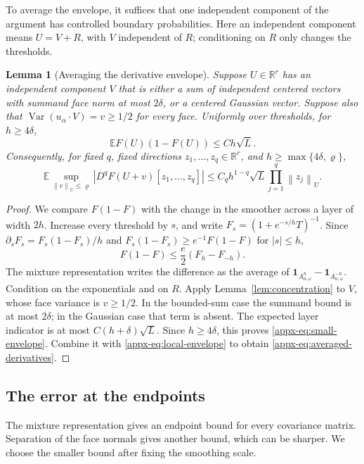 \documentclass[11pt,letterpaper]{article}
\newtheorem{lemma}{Lemma}
\theoremstyle{remark}
\newcommand{\E}{\mathbb E}
\newcommand{\R}{\mathbb R}
\newcommand{\Var}{\operatorname{Var}}
\newcommand{\norm}[1]{\left\lVert#1\right\rVert}
\newcommand{\ind}{\mathbf 1}
\begin{document}
To average the envelope, it suffices that one independent component
of the argument has controlled boundary probabilities. Here an
independent component means \(U=V+R\), with \(V\) independent of \(R\);
conditioning on \(R\) only changes the thresholds.
\begin{lemma}[Averaging the derivative envelope]\label{appx-lem:envelope}
Suppose \(U\in\R^r\) has an independent component \(V\) that is
either a sum of independent centered vectors with summand face norm
at most \(2\delta\), or a centered Gaussian vector. Suppose also
that \(\Var(u_\alpha\cdot V)=v\ge1/2\) for every face.
Uniformly over thresholds, for \(h\ge4\delta\),
\begin{equation}
 \E F(U)(1-F(U))\le Ch\sqrt L.
 \label{appx-eq:small-envelope}
\end{equation}
Consequently, for fixed \(q\), fixed directions
\(z_1,\ldots,z_q\in\R^r\), and \(h\ge\max\{4\delta,\varrho\}\),
\begin{equation}
 \E\sup_{\norm v_U\le\varrho}|D^qF(U+v)[z_1,\ldots,z_q]|
 \le C_qh^{1-q}\sqrt L\prod_{j=1}^q\norm{z_j}_U.
 \label{appx-eq:averaged-derivatives}
\end{equation}
\end{lemma}

\begin{proof}
We compare \(F(1-F)\) with the change in the smoother across a layer
of width \(2h\). Increase every threshold by \(s\), and write
\(F_s=(1+e^{-s/h}T)^{-1}\). Since
\(\partial_sF_s=F_s(1-F_s)/h\) and
\(F_s(1-F_s)\ge e^{-1}F(1-F)\) for \(|s|\le h\),
\[
 F(1-F)\le\frac e2(F_h-F_{-h}).
\]
The mixture representation writes the difference as the average of
\(\ind_{A_{a,\omega}^h}-\ind_{A_{a,\omega}^{-h}}\).
Condition on the exponentials and on \(R\). Apply
Lemma~\ref{lem:concentration} to \(V\), whose face variance is
\(v\ge1/2\). In the bounded-sum case the summand bound is at most
\(2\delta\); in the Gaussian case that term is absent. The expected
layer indicator is at most \(C(h+\delta)\sqrt L\). Since \(h\ge4\delta\), this proves
\eqref{appx-eq:small-envelope}. Combine it with
\eqref{appx-eq:local-envelope} to obtain
\eqref{appx-eq:averaged-derivatives}.
\end{proof}

\subsection{The error at the endpoints}

The mixture representation gives an endpoint bound for every
covariance matrix. Separation of the face normals gives another
bound, which can be sharper. We choose the smaller bound after fixing
the smoothing scale.
\end{document}
